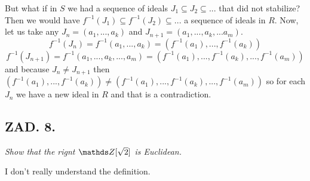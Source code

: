 \documentclass{article}[13pt]
\begin{document}
But what if in $S$ we had a sequence of ideals $J_1\subseteq J_2\subseteq...$ that did not stabilize? Then we would have $f^{-1}(J_1)\subseteq f^{-1}(J_2)\subseteq ...$ a sequence of ideals in $R$. Now, let us take any $J_n=(a_1,...,a_k)$ and $J_{n+1}=(a_1,...,a_k,...a_m)$.
$$f^{-1}(J_n)=f^{-1}(a_1,...,a_k)=(f^{-1}(a_1),...,f^{-1}(a_k))$$
$$f^{-1}(J_{n+1})=f^{-1}(a_1,...,a_k,...,a_m)=(f^{-1}(a_1),...,f^{-1}(a_k),...,f^{-1}(a_m))$$
and because $J_n\neq J_{n+1}$ then $(f^{-1}(a_1),...,f^{-1}(a_k))\neq(f^{-1}(a_1),...,f^{-1}(a_k),...,f^{-1}(a_m))$ so for each $J_n$ we have a new ideal in $R$ and that is a contradiction.

\subsection*{ZAD. 8.}
\emph{Show that the rignt $\Z[\sqrt2]$ is Euclidean.}
\medskip

\medskip

I don't really understand the definition.
\end{document}
